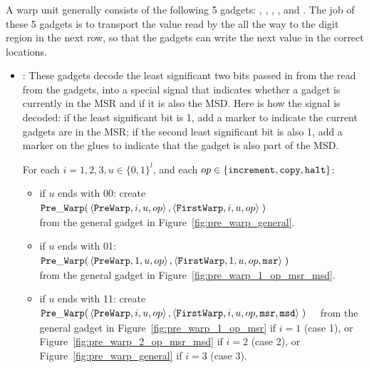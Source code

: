 \subsubsection{\warpunit}

%
A warp unit generally consists of the following 5 gadgets: \prewarp, \firstwarp, \warpbridge, \secondwarp, and \postwarp.
%
The job of these 5 gadgets is to transport the value read by the {\cread} all the way to the digit region in the next row, so that the {\cwrite} gadgets can write the next value in the correct locations.
%


\begin{itemize}

    \item {\prewarp}:
    These gadgets decode the least significant two bits passed in from the read from the {\cread} gadgets, into a special signal that indicates whether a gadget is currently in the MSR and if it is also the MSD.
    Here is how the signal is decoded: if the least significant bit is 1, add a marker to indicate the current gadgets are in the MSR; if the second least significant bit is also 1, add a marker on the glues to indicate that the gadget is also part of the MSD.

    For each $i = 1,2,3, u \in \{0, 1\}^l$, and each $op \in \{ {\tt increment}, {\tt copy}, {\tt halt} \}$:
    \begin{itemize}
        \item if $u$ ends with 00:
        create
        $\begin{aligned}[t]
            {\tt Pre\_Warp}(& \left\langle {\tt PreWarp},   i, u, op \right\rangle,
                       \left\langle {\tt FirstWarp}, i, u, op \right\rangle \;)
        \end{aligned}$ \\ from the general gadget in Figure~\ref{fig:pre_warp_general}.

        \item if $u$ ends with 01:
        $\begin{aligned}[t]
            {\tt Pre\_Warp}(& \left\langle {\tt PreWarp},   1, u, op            \right\rangle,
                       \left\langle {\tt FirstWarp}, 1, u, op, {\tt msr} \right\rangle \;)
        \end{aligned}$ \\ from the general gadget in Figure~\ref{fig:pre_warp_1_op_msr_msd}.

        \item if $u$ ends with 11:
        create
        $\begin{aligned}[t]
            {\tt Pre\_Warp}(& \left\langle {\tt PreWarp},   i, u, op                       \right\rangle,
                       \left\langle {\tt FirstWarp}, i, u, op, {\tt msr}, {\tt msd} \right\rangle \;)
        \end{aligned}$ from the general gadget in Figure~\ref{fig:pre_warp_1_op_msr} if $i = 1$ (case 1),
        or Figure~\ref{fig:pre_warp_2_op_msr_msd} if $i = 2$ (case 2), or Figure~\ref{fig:pre_warp_general} if $i = 3$ (case 3).
    \end{itemize}
    \vspace{.5cm}


\end{itemize}
